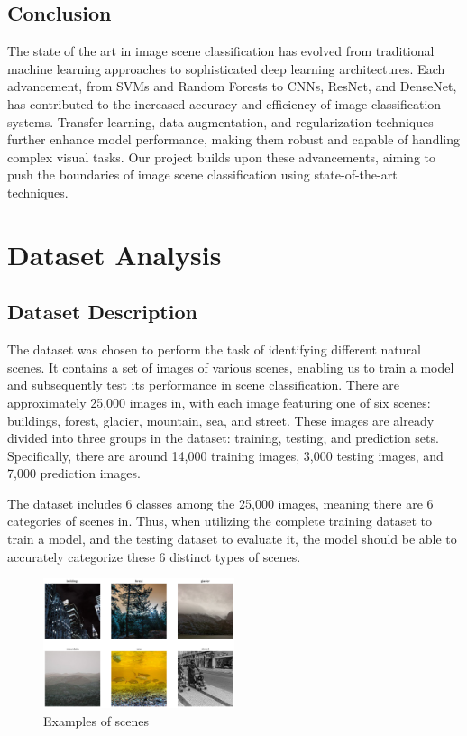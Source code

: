 \documentclass[conference]{IEEEtran}
\begin{document}
\subsection{Conclusion}

The state of the art in image scene classification has evolved from traditional machine learning approaches to sophisticated deep learning architectures. Each advancement, from SVMs and Random Forests to CNNs, ResNet, and DenseNet, has contributed to the increased accuracy and efficiency of image classification systems. Transfer learning, data augmentation, and regularization techniques further enhance model performance, making them robust and capable of handling complex visual tasks. Our project builds upon these advancements, aiming to push the boundaries of image scene classification using state-of-the-art techniques.


\section{Dataset Analysis}

\subsection{Dataset Description}

The dataset was chosen to perform the task of identifying different natural scenes. It contains a set of images of various scenes, enabling us to train a model and subsequently test its performance in scene classification. There are approximately 25,000 images in, with each image featuring one of six scenes: buildings, forest, glacier, mountain, sea, and street. These images are already divided into three groups in the dataset: training, testing, and prediction sets. Specifically, there are around 14,000 training images, 3,000 testing images, and 7,000 prediction images.

The dataset includes 6 classes among the 25,000 images, meaning there are 6 categories of scenes in. Thus, when utilizing the complete training dataset to train a model, and the testing dataset to evaluate it, the model should be able to accurately categorize these 6 distinct types of scenes.

\begin{figure}[H]
\centering
    \includegraphics[width=0.5\textwidth]{images/examplesImages.png}
    \caption{Examples of scenes}
\end{figure}
\end{document}
